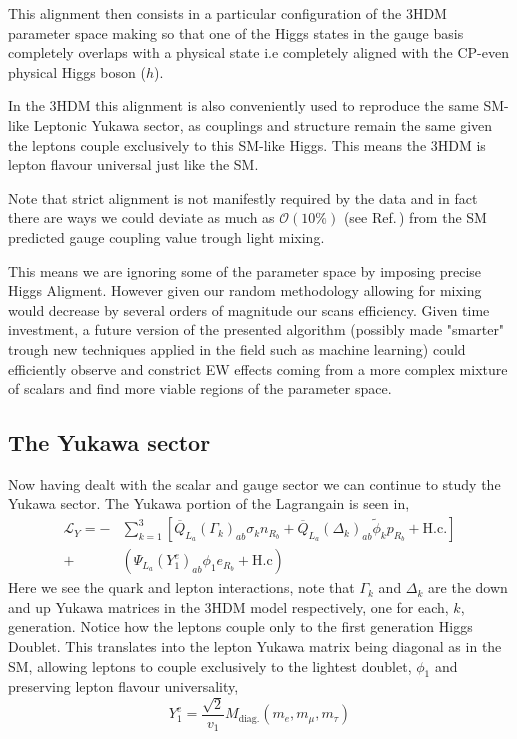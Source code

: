 This alignment then consists in a particular configuration of the 3HDM parameter space making so that one of the Higgs states in the gauge basis completely overlaps with a physical state i.e completely aligned with the CP-even physical Higgs boson ($h$). 

In the 3HDM this alignment is also conveniently used to reproduce the same SM-like Leptonic Yukawa sector, as couplings and structure remain the same given the leptons couple exclusively to this SM-like Higgs. 
%
This means the 3HDM is lepton flavour universal just like the SM. 

Note that strict alignment is not manifestly required by the data and in fact there are ways we could deviate as much as $\mathcal{O}(10\%)$ (see Ref.\,\cite{Aad_2020}) from the SM predicted gauge coupling value trough light mixing. 

This means we are ignoring some of the parameter space by imposing precise Higgs Aligment.
%
However given our random methodology allowing for mixing would decrease by several orders of magnitude our scans efficiency. 
%
Given time investment, a future version of the presented algorithm (possibly made "smarter" trough new techniques applied in the field such as machine learning) could efficiently observe and constrict EW effects coming from a more complex mixture of scalars and find more viable regions of the parameter space.  

\subsection{The Yukawa sector}

Now having dealt with the scalar and gauge sector we can continue to study the Yukawa sector. 
%
The Yukawa portion of the Lagrangain is seen in,
\begin{equation} \label{eq:3HDM_Yuk} \begin{split} 
\mathcal{L}_Y = - & \sum_{k=1}^3 \left[ \overline{Q}_{L_a} \left( \Gamma_k \right)_{ab} \sigma_k n_{R_b} + \overline{Q}_{L_a} \left( \Delta_k \right)_{ab} \tilde{\phi}_k p_{R_b} + \text{H.c}.  \right] \\ + & \left( \Psi_{L_a} \left( Y^e_1 \right)_{ab} \phi_1 e_{R_b} + \text{H.c} \right)
\end{split} \end{equation}   
Here we see the quark and lepton interactions, note that $\Gamma_k$ and $\Delta_k$ are the down and up Yukawa matrices in the 3HDM model respectively, one for each, $k$, generation.
%
Notice how the leptons couple only to the first generation Higgs Doublet. 
%
This translates into the lepton Yukawa matrix being diagonal as in the SM, allowing leptons to couple exclusively to the lightest doublet, $\phi_1$ and preserving lepton flavour universality, 
%
\begin{equation}
Y^e_1 = \frac{\sqrt{2}}{v_1} M_{\text{diag.}}\left( m_e , m_\mu , m_\tau \right)
\end{equation} 

